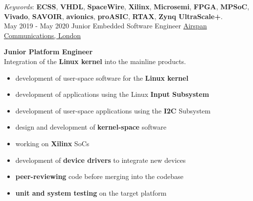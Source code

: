 \documentclass[letterpaper]{twentysecondcv} %
\begin{document}
\begin{twenty}
{            \vspace{1 mm}
            \textit{Keywords}: \textbf{ECSS}, \textbf{VHDL}, \textbf{SpaceWire}, \textbf{Xilinx}, \textbf{Microsemi}, \textbf{FPGA}, \textbf{MPSoC}, \textbf{Vivado}, \textbf{SAVOIR}, \textbf{avionics}, \textbf{proASIC}, \textbf{RTAX}, \textbf{Zynq UltraScale+}.
        }\\
    \twentyitem
    	{May 2019 -}
		{May 2020}
        {Junior Embedded Software Engineer}
        {\href{https://www.airspan.com/}{Airspan Communications, London}}
        {}
        {
            \textbf{Junior Platform Engineer}\\
            Integration of the \textbf{Linux kernel} into the mainline products.
            \vspace{1 mm}
            \begin{itemize}
                \item development of user-space software for the \textbf{Linux kernel}
                \item development of applications using the Linux \textbf{Input Subsystem}
                \item development of user-space applications using the \textbf{I2C} Subsystem
                \item design and development of \textbf{kernel-space} software
                \item working on \textbf{Xilinx} SoCs
                \item development of \textbf{device drivers} to integrate new devices
                \item \textbf{peer-reviewing} code before merging into the codebase
                \item \textbf{unit and system testing} on the target platform
            \end{itemize}

}
\end{twenty}
\end{document}
